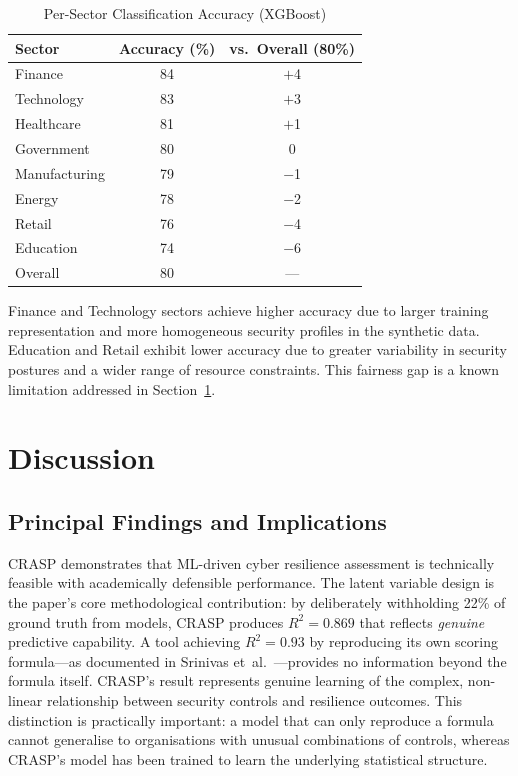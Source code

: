 \documentclass[journal]{IEEEtran}
\begin{document}
\begin{table}[!t]
\renewcommand{\arraystretch}{1.3}
\caption{Per-Sector Classification Accuracy (XGBoost)}
\label{tab:fairness}
\centering
\begin{tabular}{lcc}
\toprule
\textbf{Sector} & \textbf{Accuracy (\%)} & \textbf{vs.\ Overall (80\%)} \\
\midrule
Finance        & 84 & $+$4 \\
Technology     & 83 & $+$3 \\
Healthcare     & 81 & $+$1 \\
Government     & 80 & \phantom{$+$}0 \\
Manufacturing  & 79 & $-$1 \\
Energy         & 78 & $-$2 \\
Retail         & 76 & $-$4 \\
Education      & 74 & $-$6 \\
\midrule
Overall        & 80 & --- \\
\bottomrule
\end{tabular}
\end{table}

Finance and Technology sectors achieve higher accuracy due to larger training
representation and more homogeneous security profiles in the synthetic data.
Education and Retail exhibit lower accuracy due to greater variability in
security postures and a wider range of resource constraints. This fairness
gap is a known limitation addressed in Section~\ref{sec:disc}.


\section{Discussion}
\label{sec:disc}

\subsection{Principal Findings and Implications}

CRASP demonstrates that ML-driven cyber resilience assessment is technically
feasible with academically defensible performance. The latent variable design
is the paper's core methodological contribution: by deliberately withholding
22\% of ground truth from models, CRASP produces $R^2 = 0.869$ that reflects
\emph{genuine} predictive capability. A tool achieving $R^2 = 0.93$ by
reproducing its own scoring formula---as documented in Srinivas
et~al.~\cite{srinivas2019}---provides no information beyond the formula
itself. CRASP's result represents genuine learning of the complex, non-linear
relationship between security controls and resilience outcomes. This
distinction is practically important: a model that can only reproduce a
formula cannot generalise to organisations with unusual combinations of
controls, whereas CRASP's model has been trained to learn the underlying
statistical structure.
\end{document}
